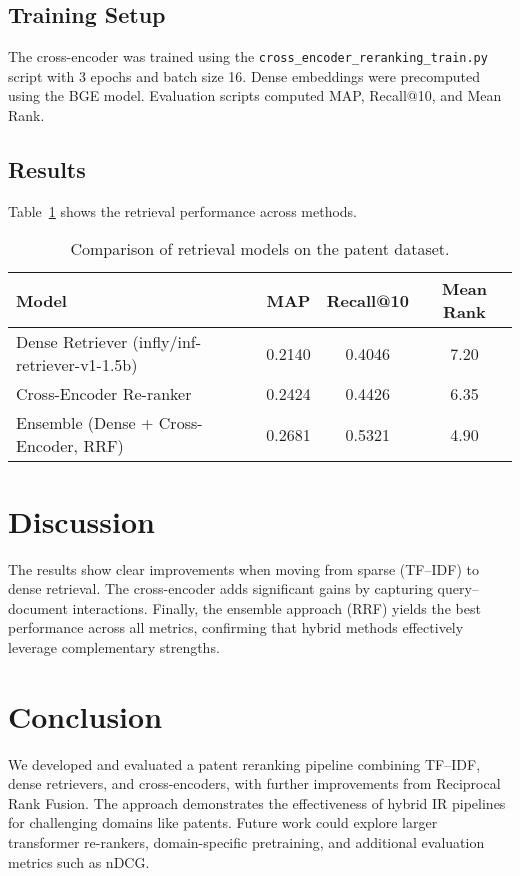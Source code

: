 \documentclass[11pt,a4paper]{article}
\begin{document}
\subsection{Training Setup}
The cross-encoder was trained using the \texttt{cross\_encoder\_reranking\_train.py} script with 3 epochs and batch size 16. Dense embeddings were precomputed using the BGE model. Evaluation scripts computed MAP, Recall@10, and Mean Rank.

\subsection{Results}
Table~\ref{tab:results} shows the retrieval performance across methods.

\begin{table}[H]
\centering
\begin{tabular}{lccc}
\toprule
\textbf{Model} & \textbf{MAP} & \textbf{Recall@10} & \textbf{Mean Rank} \\
\midrule
Dense Retriever (infly/inf-retriever-v1-1.5b) & 0.2140 & 0.4046 & 7.20 \\
Cross-Encoder Re-ranker & 0.2424 & 0.4426 & 6.35 \\
Ensemble (Dense + Cross-Encoder, RRF) & 0.2681 & 0.5321 & 4.90 \\
\bottomrule
\end{tabular}
\caption{Comparison of retrieval models on the patent dataset.}
\label{tab:results}
\end{table}

\FloatBarrier

\section{Discussion}
The results show clear improvements when moving from sparse (TF--IDF) to dense retrieval. The cross-encoder adds significant gains by capturing query--document interactions. Finally, the ensemble approach (RRF) yields the best performance across all metrics, confirming that hybrid methods effectively leverage complementary strengths.

\section{Conclusion}
We developed and evaluated a patent reranking pipeline combining TF--IDF, dense retrievers, and cross-encoders, with further improvements from Reciprocal Rank Fusion. The approach demonstrates the effectiveness of hybrid IR pipelines for challenging domains like patents. Future work could explore larger transformer re-rankers, domain-specific pretraining, and additional evaluation metrics such as nDCG.



\end{document}
